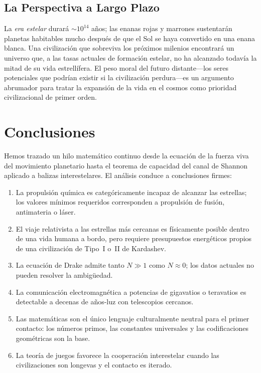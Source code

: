 \documentclass[12pt,a4paper]{article}
\begin{document}
\subsection{La Perspectiva a Largo Plazo}

La \emph{era estelar} durará $\sim 10^{14}$ años; las enanas rojas y marrones
sustentarán planetas habitables mucho después de que el Sol se haya convertido
en una enana blanca. Una civilización que sobreviva los próximos milenios
encontrará un universo que, a las tasas actuales de formación estelar, no ha
alcanzado todavía la mitad de su vida estrellífera. El peso moral del futuro
distante---los seres potenciales que podrían existir si la civilización
perdura---es un argumento abrumador para tratar la expansión de la vida en el
cosmos como prioridad civilizacional de primer orden.

\section{Conclusiones}

Hemos trazado un hilo matemático continuo desde la ecuación de la fuerza
viva del movimiento planetario hasta el teorema de capacidad del canal de
Shannon aplicado a balizas interestelares. El análisis conduce a conclusiones
firmes:

\begin{enumerate}[noitemsep]
  \item La propulsión química es categóricamente incapaz de alcanzar las
    estrellas; los valores mínimos requeridos corresponden a propulsión de
    fusión, antimateria o láser.
  \item El viaje relativista a las estrellas más cercanas es físicamente posible
    dentro de una vida humana a bordo, pero requiere presupuestos energéticos
    propios de una civilización de Tipo~I o~II de Kardashev.
  \item La ecuación de Drake admite tanto $N \gg 1$ como $N \approx 0$;
    los datos actuales no pueden resolver la ambigüedad.
  \item La comunicación electromagnética a potencias de gigavatios o
    teravatios es detectable a decenas de años-luz con telescopios cercanos.
  \item Las matemáticas son el único lenguaje culturalmente neutral para el
    primer contacto: los números primos, las constantes universales y las
    codificaciones geométricas son la base.
  \item La teoría de juegos favorece la cooperación interestelar cuando las
    civilizaciones son longevas y el contacto es iterado.
\end{enumerate}
\end{document}

